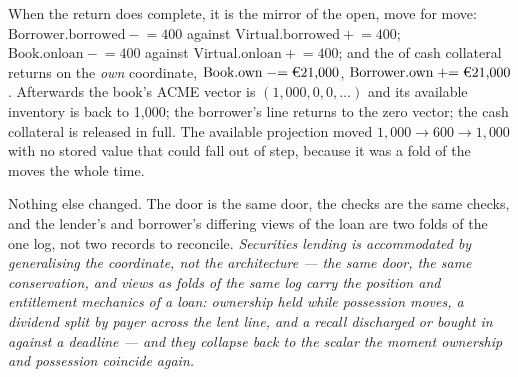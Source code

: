 When the return does complete, it is the mirror of the open, move for move:
$\text{Borrower.borrowed} \mathrel{-}= 400$ against $\text{Virtual.borrowed} \mathrel{+}=
400$; $\text{Book.onloan} \mathrel{-}= 400$ against $\text{Virtual.onloan} \mathrel{+}=
400$; and the  of cash collateral returns on the \emph{own} coordinate,
$\text{Book.own} \mathrel{-}= \EUR{21{,}000}$, $\text{Borrower.own} \mathrel{+}=
\EUR{21{,}000}$. Afterwards the book's ACME vector is $(1{,}000, 0, 0, \dots)$ and its
available inventory is back to 1{,}000; the borrower's line returns to the zero vector;
the cash collateral is released in full. The available projection moved
$1{,}000 \to 600 \to 1{,}000$ with no stored value that could fall out of step, because
it was a fold of the moves the whole time.

Nothing else changed. The door is the same door, the checks are the same checks, and
the lender's and borrower's differing views of the loan are two folds of the one log,
not two records to reconcile. \emph{Securities lending is accommodated by generalising
the coordinate, not the architecture --- the same door, the same conservation, and views
as folds of the same log carry the position and entitlement mechanics of a loan:
ownership held while possession moves, a dividend split by payer across the lent line,
and a recall discharged or bought in against a deadline --- and they collapse back to the
scalar the moment ownership and possession coincide again.}
